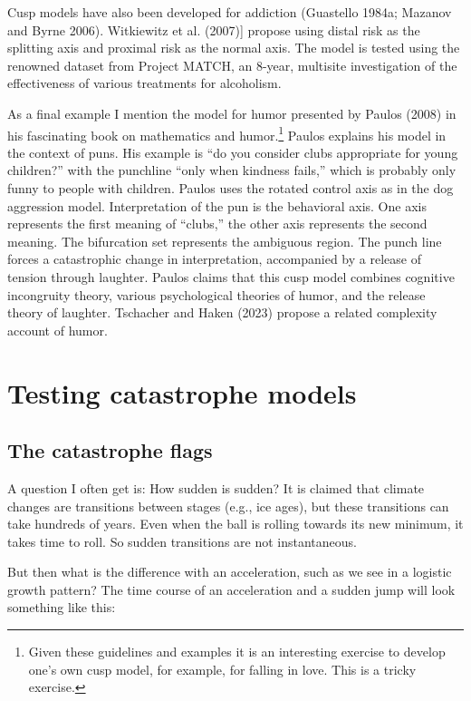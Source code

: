 \documentclass[
  a4paper,
  DIV=11,
  numbers=noendperiod,
  oneside]{scrreprt}
\begin{document}
Cusp models have also been developed for addiction (Guastello 1984a;
Mazanov and Byrne 2006). Witkiewitz et al. (2007){]} propose using
distal risk as the splitting axis and proximal risk as the normal axis.
The model is tested using the renowned dataset from Project MATCH, an
8-year, multisite investigation of the effectiveness of various
treatments for alcoholism.

As a final example I mention the model for humor presented by Paulos
(2008) in his fascinating book on mathematics and humor.\footnote{Given
  these guidelines and examples it is an interesting exercise to develop
  one's own cusp model, for example, for falling in love. This is a
  tricky exercise.} Paulos explains his model in the context of puns.
His example is ``do you consider clubs appropriate for young children?''
with the punchline ``only when kindness fails,'' which is probably only
funny to people with children. Paulos uses the rotated control axis as
in the dog aggression model. Interpretation of the pun is the behavioral
axis. One axis represents the first meaning of ``clubs,'' the other axis
represents the second meaning. The bifurcation set represents the
ambiguous region. The punch line forces a catastrophic change in
interpretation, accompanied by a release of tension through laughter.
Paulos claims that this cusp model combines cognitive incongruity
theory, various psychological theories of humor, and the release theory
of laughter. Tschacher and Haken (2023) propose a related complexity
account of humor.

\hypertarget{sec-Testing-catastrophe-models}{%
\section{Testing catastrophe
models}\label{sec-Testing-catastrophe-models}}

\hypertarget{sec-The-catastrophe-flags}{%
\subsection{The catastrophe flags}\label{sec-The-catastrophe-flags}}

A question I often get is: How sudden is sudden? It is claimed that
climate changes are transitions between stages (e.g., ice ages), but
these transitions can take hundreds of years. Even when the ball is
rolling towards its new minimum, it takes time to roll. So sudden
transitions are not instantaneous.

But then what is the difference with an acceleration, such as we see in
a logistic growth pattern? The time course of an acceleration and a
sudden jump will look something like this:
\end{document}
